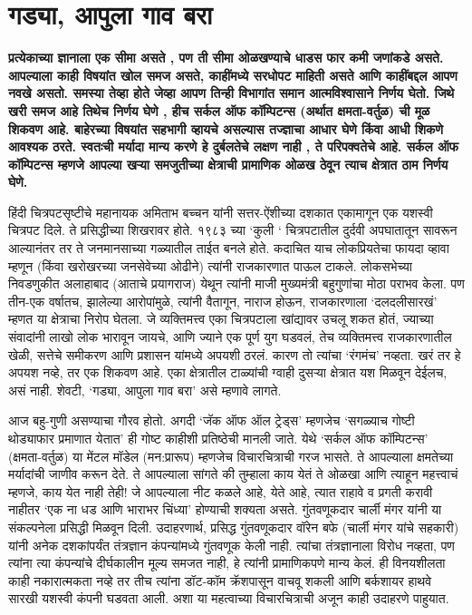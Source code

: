 \chapter{गड्या, आपुला गाव बरा}

\textcolor{blue!60!black}{\textbf{प्रत्येकाच्या ज्ञानाला एक सीमा असते , पण ती सीमा ओळखण्याचे धाडस फार कमी जणांकडे असते. आपल्याला काही विषयांत खोल समज असते, काहींमध्ये सरधोपट माहिती असते आणि काहींबद्दल आपण नवखे असतो. समस्या तेव्हा होते जेव्हा आपण तिन्ही विभागांत समान आत्मविश्वासाने निर्णय घेतो. जिथे खरी समज आहे तिथेच निर्णय घेणे , हीच सर्कल ऑफ कॉम्पिटन्स (अर्थात क्षमता-वर्तुळ) ची मूळ शिकवण आहे. बाहेरच्या विषयांत सहभागी व्हायचे असल्यास तज्ज्ञाचा आधार घेणे किंवा आधी शिकणे आवश्यक ठरते. स्वतःची मर्यादा मान्य करणे हे दुर्बलतेचे लक्षण नाही , ते परिपक्वतेचे आहे. सर्कल ऑफ कॉम्पिटन्स म्हणजे आपल्या खऱ्या समजुतीच्या क्षेत्राची प्रामाणिक ओळख ठेवून त्याच क्षेत्रात ठाम निर्णय घेणे.}}

हिंदी चित्रपटसृष्टीचे महानायक अमिताभ बच्चन यांनी सत्तर-ऐंशीच्या दशकात एकामागून एक यशस्वी चित्रपट दिले. ते प्रसिद्धीच्या शिखरावर होते. १९८३ च्या ‘कुली ‘ चित्रपटातील दुर्दवी अपघातातून सावरून आल्यानंतर तर ते जनमानसाच्या गळ्यातील ताईत बनले होते. कदाचित याच लोकप्रियतेचा फायदा व्हावा म्हणून (किंवा खरोखरच्या जनसेवेच्या ओढीने) त्यांनी राजकारणात पाऊल टाकले. लोकसभेच्या निवडणुकीत अलाहाबाद (आताचे प्रयागराज) येथून त्यांनी माजी मुख्यमंत्री बहुगुणांचा मोठा पराभव केला. पण तीन-एक वर्षातच, झालेल्या आरोपांमुळे, त्यांनी वैतागून, नाराज होऊन, राजकारणाला ‘दलदलीसारखं’ म्हणत या क्षेत्राचा निरोप घेतला. जे व्यक्तिमत्त्व एका चित्रपटाला खांद्यावर उचलू शकत होतं, ज्याच्या संवादांनी लाखो लोक भारावून जायचे, आणि ज्याने एक पूर्ण युग घडवलं, तेच व्यक्तिमत्त्व राजकारणातील खेळी, सत्तेचे समीकरण आणि प्रशासन यांमध्ये अपयशी ठरलं. कारण तो त्यांचा ‘रंगमंच’ नव्हता. खरं तर हे अपयश नव्हे, तर एक शिकवण आहे. एका क्षेत्रातील टाळ्यांची ग्वाही दुसऱ्या क्षेत्रात यश मिळवून देईलच, असं नाही. शेवटी, ‘गड्या, आपुला गाव बरा’ असे म्हणावे लागते. 

आज बहु-गुणी असण्याचा गौरव होतो. अगदी ‘जॅक ऑफ ऑल ट्रेड्स’ म्हणजेच ‘सगळ्याच गोष्टी थोड्याफार प्रमाणात येतात’ ही गोष्ट काहीशी प्रतिष्ठेची मानली जाते.  येथे ‘सर्कल ऑफ कॉम्पिटन्स’ (क्षमता-वर्तुळ) या मेंटल मॉडेल (मन:प्रारूप) म्हणजेच विचारचित्राची गरज भासते. ते आपल्याला क्षमतेच्या मर्यादांची जाणीव करून देते. ते आपल्याला सांगते की तुम्हाला काय येतं ते ओळखा आणि त्याहून महत्त्वाचं म्हणजे, काय येत नाही तेही! जे आपल्याला नीट कळले आहे, येते आहे, त्यात राहावे व प्रगती करावी नाहीतर ‘एक ना धड आणि भाराभर चिंध्या’ होण्याची शक्यता असते. गुंतवणूकदार चार्ली मंगर यांनी या संकल्पनेला प्रसिद्धी मिळवून दिली. उदाहरणार्थ, प्रसिद्ध गुंतवणूकदार वॉरेन बफे (चार्ली मंगर यांचे सहकारी) यांनी अनेक दशकांपर्यंत तंत्रज्ञान कंपन्यांमध्ये गुंतवणूक केली नाही. त्यांचा तंत्रज्ञानाला विरोध नव्हता, पण त्यांना त्या कंपन्यांचे दीर्घकालीन मूल्य समजत नाही, हे त्यांनी प्रामाणिकपणे मान्य केलं. ही विनयशीलता काही नकारात्मकता नव्हे तर तीच त्यांना डॉट-कॉम क्रॅशपासून वाचवू शकली आणि बर्कशायर हाथवे सारखी यशस्वी कंपनी घडवता आली. अशा या महत्वाच्या विचारचित्राची अजून काही उदाहरणे पाहुयात. 


